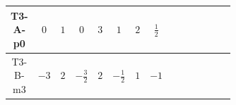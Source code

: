 \documentclass[8pt]{article}
\begin{document}
\begin{landscape}
\begin{longtable}{@{}cccccccc >{\raggedright\arraybackslash}p{0.21\linewidth} >{\raggedright\arraybackslash}p{0.21\linewidth} >{\raggedright\arraybackslash}p{0.21\linewidth}@{}}
\midrule
T3-A-p0 & $0$ & $1$ & $0$ & $3$ & $1$ & $2$ & $\frac{1}{2}$ &  & \scriptsize\adjustbox{max width=\linewidth}{$\begin{gathered} -\frac{2 \hbar  \log \left(\frac{\bar{\mu}^{2}}{M_F^2}\right) \overline{y_{2,i_1,r_1}} \overline{Y_{e,i_2,i_3}} H_{a_1} S_{2,j_1} y_{2,i_2,r_1} Y_{e,i_1,i_3} H_{a_1}{}^{\dagger } S_{2,j_1}{}^{\dagger }}{\sqrt{3}} \\ -2 i \sqrt{\frac{2}{3}} \hbar  \log \left(\frac{\bar{\mu}^{2}}{M_F^2}\right) \overline{y_{2,i_1,r_1}} \overline{Y_{e,i_2,i_3}} H_{a_2} S_{2,j_2} y_{2,i_2,r_1} Y_{e,i_1,i_3} H_{a_1}{}^{\dagger } S_{2,j_1}{}^{\dagger } \mathcal{I}_{H2,a_1,a_2,j_1,j_2}{}^1 \\ -\frac{2 \hbar  \log \left(\frac{\bar{\mu}^{2}}{M_F^2}\right) \overline{y_{2,i_1,r_1}} H_{a_2} S_{2,j_2} y_{2,i_1,r_1} H_{a_1}{}^{\dagger } S_{2,j_1}{}^{\dagger } \mathcal{I}_{H2,a_1,a_2,j_1,j_2}{}^2 \lambda_{HS_2}^{(1)}^{(2)}}{\sqrt{3}}\end{gathered}$} &  \\
\midrule
T3-B-m3 & $-3$ & $2$ & $-\frac{3}{2}$ & $2$ & $-\frac{1}{2}$ & $1$ & $-1$ &  & \scriptsize\adjustbox{max width=\linewidth}{$\begin{gathered} -2 \hbar  \log \left(\frac{\bar{\mu}^{2}}{M_F^2}\right) \overline{y_{2,i_1,r_1}} \overline{Y_{e,i_2,i_3}} H_{a_2} S_{2,j_2} y_{2,i_2,r_1} Y_{e,i_1,i_3} \mathcal{I}_{y_2,a_1,j_1} {\mathcal{C}_{LS_2F}}^{*}_{a_2,j_2} H_{a_1}{}^{\dagger } S_{2,j_1}{}^{\dagger } \\ -\hbar  \log \left(\frac{\bar{\mu}^{2}}{M_F^2}\right) \overline{y_{2,i_1,r_1}} H_{a_2} S_{2,j_2} y_{2,i_1,r_1} H_{a_1}{}^{\dagger } S_{2,j_1}{}^{\dagger } \mathcal{I}_{H2,a_1,a_2,j_1,j_2}{}^1 \lambda_{HS_2}^{(1)}^{(1)} \\ -\hbar  \log \left(\frac{\bar{\mu}^{2}}{M_F^2}\right) \overline{y_{2,i_1,r_1}} H_{a_2} S_{2,j_2} y_{2,i_1,r_1} H_{a_1}{}^{\dagger } S_{2,j_1}{}^{\dagger } \mathcal{I}_{H2,a_1,a_2,j_1,j_2}{}^2 \lambda_{HS_2}^{(1)}^{(2)}\end{gathered}$} &  \\
\midrule

\end{longtable}
\end{landscape}
\end{document}
